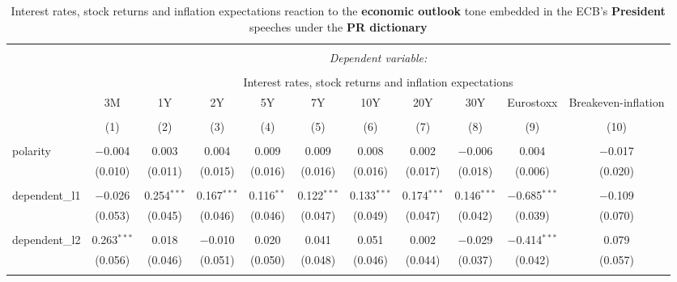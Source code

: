 
\begin{table}[!htbp] \centering 
  \caption[PR Economic Outlook Tone \& Interest Rates, Stock Returns, Inflation Expectations: president speeches]{Interest rates, stock returns and inflation expectations reaction to the \textbf{economic outlook} tone embedded in the ECB's \textbf{President} speeches under the \textbf{PR dictionary}} 
  \label{tab:assets_president_pr_ec} 
  \begin{adjustbox}{width=1.25\textwidth}
\begin{tabular}{@{\extracolsep{5pt}}lcccccccccc} 
\\[-1.8ex]\hline 
\hline \\[-1.8ex] 
 & \multicolumn{10}{c}{\textit{Dependent variable:}} \\ 
\cline{2-11} 
\\[-1.8ex] & \multicolumn{10}{c}{Interest rates, stock returns and inflation expectations} \\ 
 & 3M & 1Y & 2Y & 5Y & 7Y & 10Y & 20Y & 30Y & Eurostoxx & Breakeven-inflation \\ 
\\[-1.8ex] & (1) & (2) & (3) & (4) & (5) & (6) & (7) & (8) & (9) & (10)\\ 
\hline \\[-1.8ex] 
 polarity & $-$0.004 & 0.003 & 0.004 & 0.009 & 0.009 & 0.008 & 0.002 & $-$0.006 & 0.004 & $-$0.017 \\ 
  & (0.010) & (0.011) & (0.015) & (0.016) & (0.016) & (0.016) & (0.017) & (0.018) & (0.006) & (0.020) \\ 
  & & & & & & & & & & \\ 
 dependent\_l1 & $-$0.026 & 0.254$^{***}$ & 0.167$^{***}$ & 0.116$^{**}$ & 0.122$^{***}$ & 0.133$^{***}$ & 0.174$^{***}$ & 0.146$^{***}$ & $-$0.685$^{***}$ & $-$0.109 \\ 
  & (0.053) & (0.045) & (0.046) & (0.046) & (0.047) & (0.049) & (0.047) & (0.042) & (0.039) & (0.070) \\ 
  & & & & & & & & & & \\ 
 dependent\_l2 & 0.263$^{***}$ & 0.018 & $-$0.010 & 0.020 & 0.041 & 0.051 & 0.002 & $-$0.029 & $-$0.414$^{***}$ & 0.079 \\ 
  & (0.056) & (0.046) & (0.051) & (0.050) & (0.048) & (0.046) & (0.044) & (0.037) & (0.042) & (0.057) \\ 
  & & & & & & & & & & \\ 

\end{tabular}
\end{adjustbox}
\end{table}
